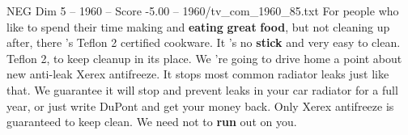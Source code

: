 \begin{textsample}{NEG Dim 5 – 1960 – Score -5.00 – 1960/tv\_com\_1960\_85.txt}  \label{ex:f5_neg_001}
For people who like to spend their time making and \textbf{eating} \textbf{great} \textbf{food}, but not cleaning up after, there 's Teflon 2 certified cookware.
It 's no \textbf{stick} and very easy to clean.
Teflon 2, to keep cleanup in its place.
We 're going to drive home a point about new anti-leak Xerex antifreeze.
It stops most common radiator leaks just like that.
We guarantee it will stop and prevent leaks in your car radiator for a full year, or just write DuPont and get your money back.
Only Xerex antifreeze is guaranteed to keep clean.
We need not to \textbf{run} out on you.

\end{textsample}
